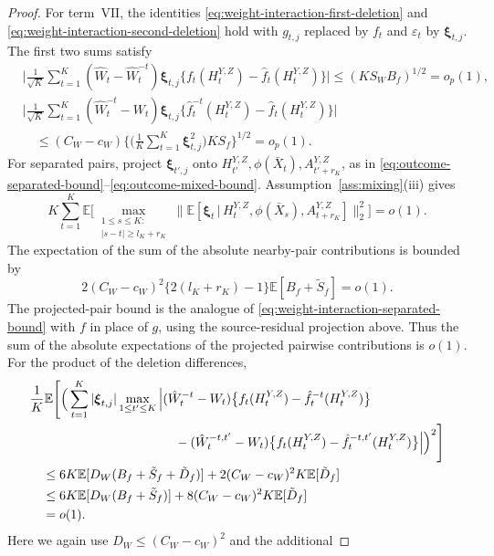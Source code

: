 \documentclass[12pt]{article}
\def\E{\mathbb{E}}
\newcommand\given{\,|\,}
\numberwithin{equation}{section}
\begin{document}
\begin{proof}
For term~\(\mathrm{VII}\), the identities
\eqref{eq:weight-interaction-first-deletion} and
\eqref{eq:weight-interaction-second-deletion} hold with
\(g_{t,j}\) replaced by \(f_t\) and \(\varepsilon_t\) by
\(\boldsymbol\xi_{t,j}\). The first two sums satisfy
\begin{align*}
&\Big|\frac1{\sqrt K}\sum_{t=1}^K
(\hat W_t-\hat W_t^{-t})\boldsymbol\xi_{t,j}
\big\{f_t(H_t^{Y,Z})-\hat f_t(H_t^{Y,Z})\big\}\Big|
\leq(KS_WB_f)^{1/2}=o_p(1),\\
&\Big|\frac1{\sqrt K}\sum_{t=1}^K
(\hat W_t^{-t}-W_t)\boldsymbol\xi_{t,j}
\big\{\hat f_t^{-t}(H_t^{Y,Z})
-\hat f_t(H_t^{Y,Z})\big\}\Big|\\
&\quad\leq(C_W-c_W)
\Big\{\Big(\frac1K\sum_{t=1}^K\boldsymbol\xi_{t,j}^2\Big)
KS_f\Big\}^{1/2}
=o_p(1).
\end{align*}
For separated pairs, project \(\boldsymbol\xi_{t',j}\) onto
\(H_{t'}^{Y,Z},\phi(\bar X_t),A_{t'+r_K}^{Y,Z}\), as in
\eqref{eq:outcome-separated-bound}--\eqref{eq:outcome-mixed-bound}.
Assumption~\ref{ass:mixing}(iii) gives
\[
K\sum_{t=1}^K
\E\Big[
\max_{\substack{1\leq s\leq K:\\|s-t|\geq l_K+r_K}}
\big\|\E[\boldsymbol\xi_t\given
H_t^{Y,Z},\phi(\bar X_s),A_{t+r_K}^{Y,Z}]\big\|_2^2
\Big]
=o(1).
\]
The expectation of the sum of the absolute nearby-pair
contributions is bounded by
\[
2(C_W-c_W)^2\{2(l_K+r_K)-1\}\E[B_f+\tilde S_f]
=o(1).
\]
The projected-pair bound is the analogue of
\eqref{eq:weight-interaction-separated-bound} with \(f\) in place
of \(g\), using the source-residual projection above. Thus the
sum of the absolute expectations of the projected pairwise
contributions is \(o(1)\).
For the product of the deletion differences,
\begin{align}
&\frac1K\E\Bigg[
\Big(\sum_{t=1}^K|\boldsymbol\xi_{t,j}|
\max_{1\leq t'\leq K}\Big|
(\hat W_t^{-t}-W_t)
\big\{f_t(H_t^{Y,Z})-\hat f_t^{-t}(H_t^{Y,Z})\big\}
\notag\\*
&\hspace{40mm}{}-
(\hat W_t^{-t,t'}-W_t)
\big\{f_t(H_t^{Y,Z})-\hat f_t^{-t,t'}(H_t^{Y,Z})\big\}
\Big|\Big)^2
\Bigg]\notag\\
&\quad\leq
6K\E[D_W(B_f+\tilde S_f+\tilde D_f)]
+2(C_W-c_W)^2K\E[\tilde D_f]\notag\\
&\quad\leq
6K\E[D_W(B_f+\tilde S_f)]
+8(C_W-c_W)^2K\E[\tilde D_f]\notag\\
&\quad=o(1).
\label{eq:weight-outcome-interaction-bound}
\end{align}
Here we again use \(D_W\leq(C_W-c_W)^2\) and the additional

\end{proof}
\end{document}

